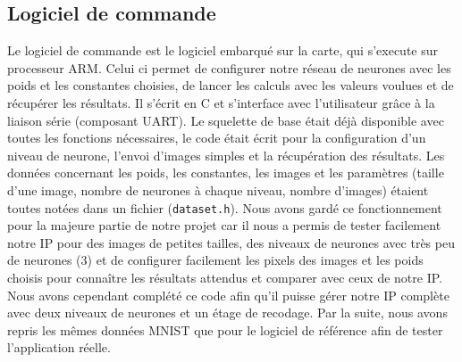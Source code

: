 \subsection{Logiciel de commande}
Le logiciel de commande est le logiciel embarqué sur la carte, qui s'execute
sur processeur ARM. Celui ci permet de configurer notre réseau de neurones avec
les poids et les constantes choisies, de lancer les calculs avec les valeurs
voulues et de récupérer les résultats. Il s'écrit en C et s'interface avec
l'utilisateur grâce à la liaison série (composant UART). Le squelette de base
était déjà disponible avec toutes les fonctions nécessaires, le code était
écrit pour la configuration d'un niveau de neurone, l'envoi d'images simples et
la récupération des résultats. Les données
concernant les poids, les constantes, les images et les paramètres (taille d'une
image, nombre de neurones à chaque niveau, nombre d'images) étaient toutes notées
dans un fichier (\texttt{dataset.h}). Nous avons gardé ce fonctionnement pour la
majeure partie de notre projet car il nous a permis de tester facilement notre
IP pour des images de petites tailles, des niveaux de neurones avec très peu
de neurones (3) et de configurer facilement les pixels des images et les poids
choisis pour connaître les résultats attendus et comparer avec ceux de notre IP.
Nous avons cependant complété ce code afin qu'il puisse gérer notre IP complète
avec deux niveaux de neurones et un étage de recodage.
Par la suite, nous avons repris les mêmes données MNIST que pour le logiciel de
référence afin de tester l'application réelle. \\

